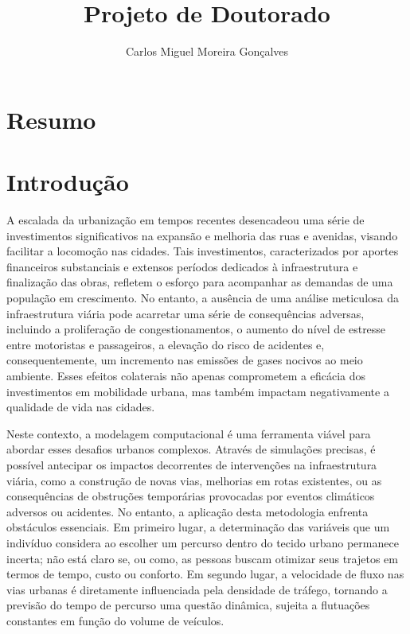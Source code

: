 \documentclass{article}
\title{Projeto de Doutorado}
\author{Carlos Miguel Moreira Gonçalves}
\begin{document}
\maketitle

\section{Resumo}

\section{Introdução}


A escalada da urbanização em tempos recentes desencadeou uma série de investimentos significativos na expansão e melhoria das ruas e avenidas, visando facilitar a locomoção nas cidades. Tais investimentos, caracterizados por aportes financeiros substanciais e extensos períodos dedicados à infraestrutura e finalização das obras, refletem o esforço para acompanhar as demandas de uma população em crescimento. No entanto, a ausência de uma análise meticulosa da infraestrutura viária pode acarretar uma série de consequências adversas, incluindo a proliferação de congestionamentos, o aumento do nível de estresse entre motoristas e passageiros, a elevação do risco de acidentes e, consequentemente, um incremento nas emissões de gases nocivos ao meio ambiente. Esses efeitos colaterais não apenas comprometem a eficácia dos investimentos em mobilidade urbana, mas também impactam negativamente a qualidade de vida nas cidades.


Neste contexto, a modelagem computacional é uma ferramenta viável para abordar esses desafios urbanos complexos. Através de simulações precisas, é possível antecipar os impactos decorrentes de intervenções na infraestrutura viária, como a construção de novas vias, melhorias em rotas existentes, ou as consequências de obstruções temporárias provocadas por eventos climáticos adversos ou acidentes. No entanto, a aplicação desta metodologia enfrenta obstáculos essenciais. Em primeiro lugar, a determinação das variáveis que um indivíduo considera ao escolher um percurso dentro do tecido urbano permanece incerta; não está claro se, ou como, as pessoas buscam otimizar seus trajetos em termos de tempo, custo ou conforto. Em segundo lugar, a velocidade de fluxo nas vias urbanas é diretamente influenciada pela densidade de tráfego, tornando a previsão do tempo de percurso uma questão dinâmica, sujeita a flutuações constantes em função do volume de veículos.
\end{document}
